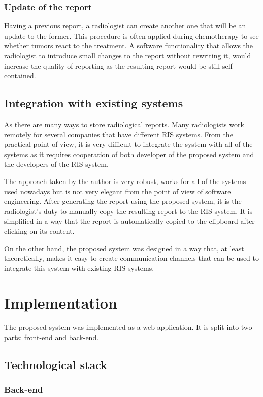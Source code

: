 \documentclass[12pt, twoside, openany]{report}
\theoremstyle{definition}
\begin{document}
\subsection{Update of the report}
Having a previous report, a radiologist can create another one that will be an update to the former. This procedure is often applied during chemotherapy to see whether tumors react to the treatment. A software functionality that allows the radiologist to introduce small changes to the report without rewriting it, would increase the quality of reporting as the resulting report would be still self-contained. 

\section{Integration with existing systems}
As there are many ways to store radiological reports. Many radiologists work remotely for several companies that have different RIS systems. From the practical point of view, it is very difficult to integrate the system with all of the systems as it requires cooperation of both developer of the proposed system and the developers of the RIS system. 

The approach taken by the author is very robust, works for all of the systems used nowadays but is not very elegant from the point of view of software engineering. 
After generating the report using the proposed system, it is the radiologist's duty to manually copy the resulting report to the RIS system. It is simplified in a way that the report is automatically copied to the clipboard after clicking on its content.

On the other hand, the proposed system was designed in a way that, at least theoretically, makes it easy to create communication channels that can be used to integrate this system with existing RIS systems. 




\chapter{Implementation}
The proposed system was implemented as a web application. It is split into two parts: front-end and back-end.  
\section{Technological stack}

\subsection{Back-end}
\end{document}
